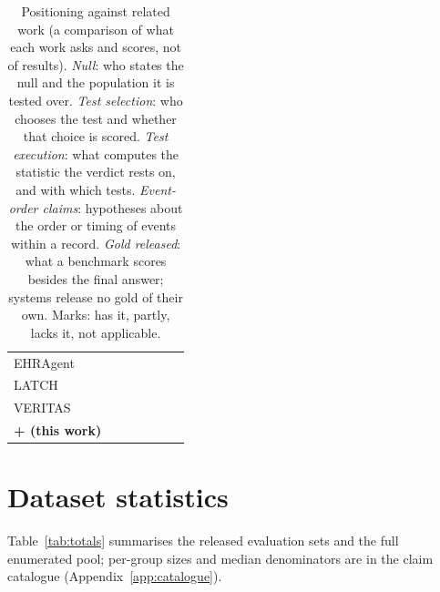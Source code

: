 \begin{table}[htbp]
\begin{tabularx}{\textwidth}{@{}p{2.5cm} Y Y Y Y Y Y@{}}
EHRAgent \cite{shi2024ehragent} &  &  &  &  &  &  \\
LATCH \cite{gim2026latch} &  &  &  &  &  &  \\
VERITAS \cite{veritas2026} &  &  &  &  &  &  \\
\midrule
\textbf{\sys{} + \art{} (this work)} &  &  &  &  &  &  \\
\bottomrule
\end{tabularx}
\caption{Positioning against related work (a comparison of what each work asks and scores, not of results). \emph{Null}: who states the null and the
population it is tested over. \emph{Test selection}: who chooses the test
and whether that choice is scored. \emph{Test execution}: what computes the
statistic the verdict rests on, and with which tests. \emph{Event-order
claims}: hypotheses about the order or timing of events within a record.
\emph{Gold released}: what a benchmark scores besides the final answer;
systems release no gold of their own. Marks: \cmark{} has it, \pmark{} partly,
\xmark{} lacks it, \nmark{} not applicable.}
\label{tab:related-concise}
\end{table}

\iffalse  %
\section{Dataset statistics}
\label{app:datastats}

Table~\ref{tab:totals} summarises the released evaluation sets and the full
enumerated pool; per-group sizes and median denominators are in the claim
catalogue (Appendix~\ref{app:catalogue}).

